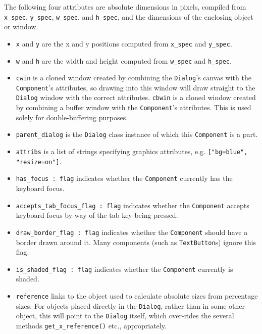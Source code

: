 The following four attributes are absolute dimensions in pixels,
compiled from \texttt{x\_spec}, \texttt{y\_spec}, \texttt{w\_spec},
and \texttt{h\_spec}, and the
dimensions of the enclosing object or window.
\begin{itemize}
\item\noindent\texttt{x} and \texttt{y} are the x and y positions computed from \texttt{x\_spec} and
\texttt{y\_spec}.

\item\noindent\texttt{w} and \texttt{h} are the width and height computed from \texttt{w\_spec} and \texttt{h\_spec}.

\item\noindent\texttt{cwin} is a cloned window created by combining the
\texttt{Dialog}'s canvas with the \texttt{Component}'s
attributes, so drawing into this window will draw straight to the
\texttt{Dialog} window with the correct attributes. \texttt{cbwin} is a cloned window
created by combining a buffer window with the
\texttt{Component}'s attributes. This is used solely for
double-buffering purposes.

\item\noindent\texttt{parent\_dialog} is the  \texttt{Dialog} class instance of which
this  \texttt{Component} is a part.

\item\noindent\texttt{attribs} is a list of strings specifying graphics attributes, e.g.
\texttt{["bg=blue", "resize=on"]}.

\item\noindent\texttt{has\_focus : flag} indicates whether the  \texttt{Component} currently has the
keyboard focus.

\item\noindent\texttt{accepts\_tab\_focus\_flag : flag} indicates whether the
 \texttt{Component} accepts keyboard focus by way of the tab key being pressed.

\item\noindent\texttt{draw\_border\_flag : flag} indicates whether the  \texttt{Component} should have a
border drawn around it. Many components (such as  \texttt{TextButton}s) ignore
this flag.

\item\noindent\texttt{is\_shaded\_flag : flag} indicates whether the  \texttt{Component}
currently is shaded.

\item\noindent\texttt{reference} links to the object used to calculate absolute sizes from
percentage sizes. For objects placed directly in the  \texttt{Dialog}, rather
than in some other object, this will point to the  \texttt{Dialog} itself,
which over-rides the several methods \texttt{get\_x\_reference()} etc.,
appropriately.
\end{itemize}

